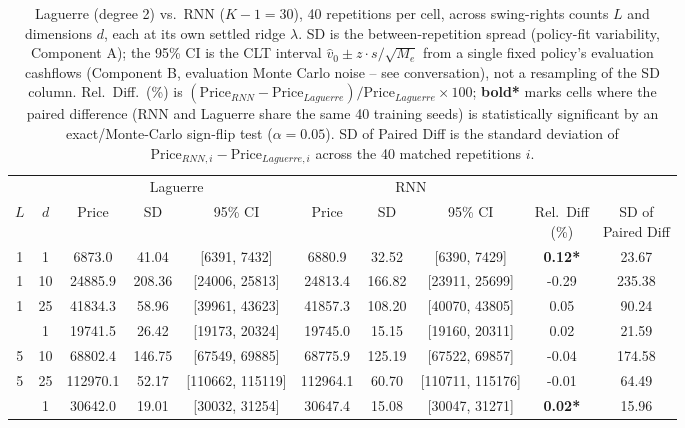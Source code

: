 \begin{table}

\caption{\label{tab:joint_lsweep}Laguerre (degree 2) vs.\ RNN ($K-1=30$), 40 repetitions per cell, across swing-rights counts $L$ and dimensions $d$, each at its own settled ridge $\lambda$. SD is the between-repetition spread (policy-fit variability, Component A); the 95\% CI is the CLT interval $\hat v_0 \pm z \cdot s/\sqrt{M_e}$ from a single fixed policy's evaluation cashflows (Component B, evaluation Monte Carlo noise -- see conversation), not a resampling of the SD column. Rel.\ Diff.\ (\%) is $(\text{Price}_{RNN} - \text{Price}_{Laguerre})/\text{Price}_{Laguerre} \times 100$; \textbf{bold*} marks cells where the paired difference (RNN and Laguerre share the same 40 training seeds) is statistically significant by an exact/Monte-Carlo sign-flip test ($\alpha=0.05$). SD of Paired Diff is the standard deviation of $\text{Price}_{RNN,i}-\text{Price}_{Laguerre,i}$ across the 40 matched repetitions $i$.}
\footnotesize
\setlength{\tabcolsep}{4pt}
\centering
\begin{tabular}[t]{cccccccccc}
\toprule
\multicolumn{2}{c}{ } & \multicolumn{3}{c}{Laguerre} & \multicolumn{3}{c}{RNN} & \multicolumn{2}{c}{ } \\
\cmidrule(l{3pt}r{3pt}){3-5} \cmidrule(l{3pt}r{3pt}){6-8}
$L$ & $d$ & Price & SD & 95\% CI & Price & SD & 95\% CI & \shortstack{Rel.\ Diff\\(\%)} & \shortstack{SD of\\Paired Diff}\\
\midrule
1 & 1 & 6873.0 & 41.04 & {}[6391, 7432] & 6880.9 & 32.52 & {}[6390, 7429] & \textbf{0.12*} & 23.67\\
1 & 10 & 24885.9 & 208.36 & {}[24006, 25813] & 24813.4 & 166.82 & {}[23911, 25699] & -0.29 & 235.38\\
1 & 25 & 41834.3 & 58.96 & {}[39961, 43623] & 41857.3 & 108.20 & {}[40070, 43805] & 0.05 & 90.24\\
\addlinespace
5 & 1 & 19741.5 & 26.42 & {}[19173, 20324] & 19745.0 & 15.15 & {}[19160, 20311] & 0.02 & 21.59\\
5 & 10 & 68802.4 & 146.75 & {}[67549, 69885] & 68775.9 & 125.19 & {}[67522, 69857] & -0.04 & 174.58\\
5 & 25 & 112970.1 & 52.17 & {}[110662, 115119] & 112964.1 & 60.70 & {}[110711, 115176] & -0.01 & 64.49\\
\addlinespace
10 & 1 & 30642.0 & 19.01 & {}[30032, 31254] & 30647.4 & 15.08 & {}[30047, 31271] & \textbf{0.02*} & 15.96\\

\end{tabular}
\end{table}
